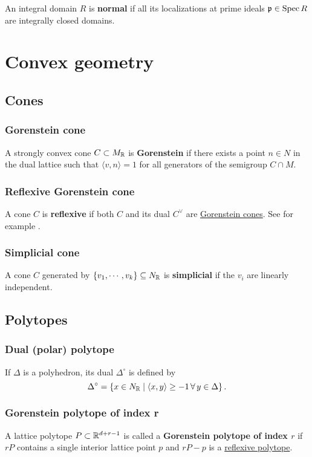 \documentclass[11pt, english]{article}
\begin{document}
An integral domain $R$ is \textbf{normal} if all its localizations at prime ideals ${\mathfrak{p} \in \operatorname{Spec} R}$ are integrally closed domains.  

\section{Convex geometry}
\subsection{Cones}
\subsubsection{Gorenstein cone}
\label{gorensteincone}

A strongly convex cone $C \subset M_{\mathbb{R}}$ is \textbf{Gorenstein} if there exists a point $n \in N$ in the dual lattice such that $\langle v,n \rangle = 1$ for all generators of the semigroup $C \cap M$.

\subsubsection{Reflexive Gorenstein cone}
\label{reflexivegorensteincone}

A cone $C$ is \textbf{reflexive} if both $C$ and its dual $C^\vee$ are \hyperref[gorensteincone]{Gorenstein cones}. See for example \cite{mirrorsymalggeo}.

\subsubsection{Simplicial cone}
A cone $C$ generated by $\{v_1, \cdots, v_k \} \subseteq N_{\mathbb{R}}$ is \textbf{simplicial} if the $v_i$ are linearly independent.

\subsection{Polytopes}

\subsubsection{Dual (polar) polytope}
\label{polarpolyhedron}

If $\Delta$ is a polyhedron, its dual $\Delta^\circ$ is defined by
\[
\Delta^\circ = \left\{ x \in N_{\mathbb{R}} \mid \langle x,y\rangle \geq -1 \,\forall \, y \in \Delta \right\}.
\]

\subsubsection{Gorenstein polytope of index r}
\label{gorensteinpolytope}
A lattice polytope $P \subset \mathbb{R}^{d+r-1}$ is called a \textbf{Gorenstein polytope of index $r$} if $rP$ contains a single interior lattice point $p$ and $rP-p$ is a \hyperref[reflexivepolytope]{reflexive polytope}.
\end{document}
